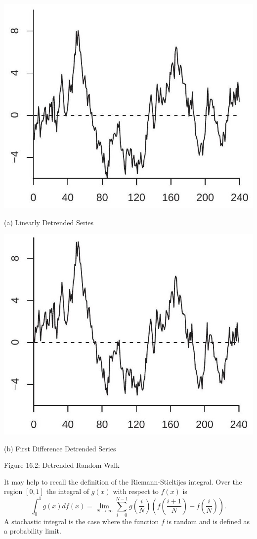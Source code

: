 \documentclass[10pt]{article}
\begin{document}
\includegraphics[max width=\textwidth]{2022_10_23_e99fc7c58db661c6f219g-11}

(a) Linearly Detrended Series

\includegraphics[max width=\textwidth]{2022_10_23_e99fc7c58db661c6f219g-11(1)}

(b) First Difference Detrended Series

Figure 16.2: Detrended Random Walk

It may help to recall the definition of the Riemann-Stieltijes integral. Over the region $[0,1]$ the integral of $g(x)$ with respect to $f(x)$ is
$$
\int_{0}^{1} g(x) d f(x)=\lim _{N \rightarrow \infty} \sum_{i=0}^{N-1} g\left(\frac{i}{N}\right)\left(f\left(\frac{i+1}{N}\right)-f\left(\frac{i}{N}\right)\right) .
$$
A stochastic integral is the case where the function $f$ is random and is defined as a probability limit.
\end{document}
